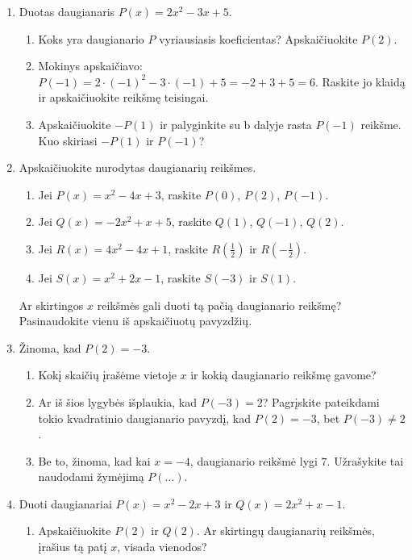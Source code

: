 \documentclass[12pt,a4paper]{exam}
\begin{document}
\begin{enumerate}
\begin{enumerate}
\item Visi trys koeficientai lygūs nuliui.
\item Laisvasis narys lygus $3$, o koeficientai $a$ ir $b$ yra priešingi skaičiai.
\end{enumerate}
\needspace{4cm}
\item Duotas daugianaris $P(x)=2x^2-3x+5$.
\begin{enumerate}
\item Koks yra daugianario $P$ vyriausiasis koeficientas? Apskaičiuokite $P(2)$.
\item Mokinys apskaičiavo: $P(-1)=2\cdot(-1)^2-3\cdot(-1)+5=-2+3+5=6$. Raskite jo klaidą ir apskaičiuokite reikšmę teisingai.
\item Apskaičiuokite $-P(1)$ ir palyginkite su b dalyje rasta $P(-1)$ reikšme. Kuo skiriasi $-P(1)$ ir $P(-1)$?
\end{enumerate}
\item Apskaičiuokite nurodytas daugianarių reikšmes.
\begin{enumerate}
\item Jei $P(x)=x^2-4x+3$, raskite $P(0)$, $P(2)$, $P(-1)$.
\item Jei $Q(x)=-2x^2+x+5$, raskite $Q(1)$, $Q(-1)$, $Q(2)$.
\item Jei $R(x)=4x^2-4x+1$, raskite $R(\frac{1}{2})$ ir $R(-\frac{1}{2})$.
\item Jei $S(x)=x^2+2x-1$, raskite $S(-3)$ ir $S(1)$.
\end{enumerate}
Ar skirtingos $x$ reikšmės gali duoti tą pačią daugianario reikšmę? Pasinaudokite vienu iš apskaičiuotų pavyzdžių.
\item Žinoma, kad $P(2)=-3$.
\begin{enumerate}
\item Kokį skaičių įrašėme vietoje $x$ ir kokią daugianario reikšmę gavome?
\item Ar iš šios lygybės išplaukia, kad $P(-3)=2$? Pagrįskite pateikdami tokio kvadratinio daugianario pavyzdį, kad $P(2)=-3$, bet $P(-3)\ne2$.
\item Be to, žinoma, kad kai $x=-4$, daugianario reikšmė lygi $7$. Užrašykite tai naudodami žymėjimą $P(\dots)$.
\end{enumerate}
\item\label{bendra-reiksme} Duoti daugianariai $P(x)=x^2-2x+3$ ir $Q(x)=2x^2+x-1$.
\begin{enumerate}
\item Apskaičiuokite $P(2)$ ir $Q(2)$. Ar skirtingų daugianarių reikšmės, įrašius tą patį $x$, visada vienodos?

\end{enumerate}
\end{enumerate}
\end{document}
